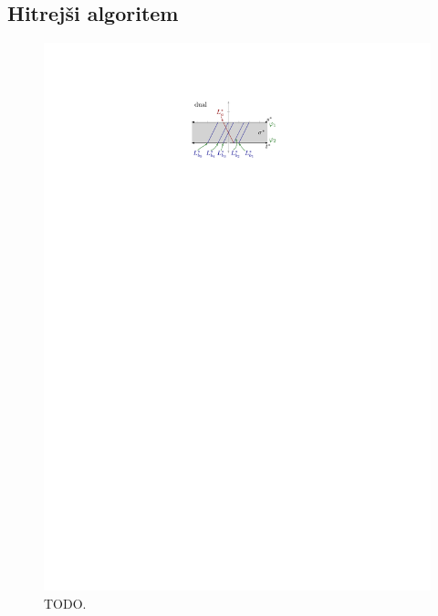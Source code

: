 \documentclass[a4paper, 12pt]{book}
\begin{document}
\subsection{Hitrejši algoritem}
\label{compact}
\begin{figure}
\centerline{\includegraphics[scale=1.2]{pics/slab.pdf}}
\caption{TODO.} 
\label{hslab}
\end{figure}
\end{document}
